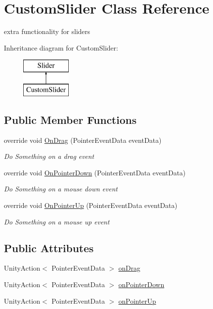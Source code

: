 \hypertarget{class_custom_slider}{}\section{Custom\+Slider Class Reference}
\label{class_custom_slider}


extra functionality for sliders  


Inheritance diagram for Custom\+Slider\+:\begin{figure}[H]
\begin{center}
\leavevmode
\includegraphics[height=2.000000cm]{class_custom_slider}
\end{center}
\end{figure}
\subsection*{Public Member Functions}
\begin{DoxyCompactItemize}
\item 
override void \mbox{\hyperlink{class_custom_slider_a1368481d25207b7ae658a6cc7a926b3e}{On\+Drag}} (Pointer\+Event\+Data event\+Data)
\begin{DoxyCompactList}\small\item\em Do Something on a drag event \end{DoxyCompactList}\item 
override void \mbox{\hyperlink{class_custom_slider_aae8edd3090cb3e61060301a6bfe143b6}{On\+Pointer\+Down}} (Pointer\+Event\+Data event\+Data)
\begin{DoxyCompactList}\small\item\em Do Something on a mouse down event \end{DoxyCompactList}\item 
override void \mbox{\hyperlink{class_custom_slider_a5bf03e20d8dd4e6a4918949efbfa9cf8}{On\+Pointer\+Up}} (Pointer\+Event\+Data event\+Data)
\begin{DoxyCompactList}\small\item\em Do Something on a mouse up event \end{DoxyCompactList}\end{DoxyCompactItemize}
\subsection*{Public Attributes}
\begin{DoxyCompactItemize}
\item 
Unity\+Action$<$ Pointer\+Event\+Data $>$ \mbox{\hyperlink{class_custom_slider_a0dddc3818a2fb5ce0810f1fba19ad642}{on\+Drag}}
\item 
Unity\+Action$<$ Pointer\+Event\+Data $>$ \mbox{\hyperlink{class_custom_slider_ab857c76b5764b6a2b6978c9a33da2a2a}{on\+Pointer\+Down}}
\item 
Unity\+Action$<$ Pointer\+Event\+Data $>$ \mbox{\hyperlink{class_custom_slider_af31b3817d4037e23991320a0674d09d2}{on\+Pointer\+Up}}
\end{DoxyCompactItemize}
